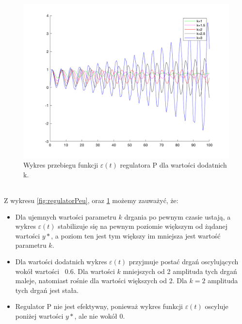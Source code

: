 \documentclass[a4paper,10pt]{article}
\begin{document}
\begin{figure}[!h]
    \centering
	\includegraphics[width=130mm]{P-kd.png}
	\caption{Wykres przebiegu funkcji $\varepsilon(t)$ regulatora P dla wartości dodatnich k.}
    \label{fig:regulatorPed}
\end{figure}
\\ Z wykresu \ref{fig:regulatorPeu}, oraz \ref{fig:regulatorPed} możemy zauważyć, że:
\begin{itemize}
	\item Dla ujemnych wartości parametru $k$ drgania po pewnym czasie ustają, a wykres $\varepsilon(t)$ stabilizuje się na pewnym poziomie większym od żądanej wartości $y*$, a poziom ten jest tym większy im mniejsza jest wartość parametru $k$.
	\item Dla wartości dodatnich wykres $\varepsilon(t)$ przyjmuje postać drgań oscylujących wokół wartości ~0.6. Dla wartości $k$ mniejszych od 2 amplituda tych drgań maleje, natomiast rośnie dla wartości większych od 2. Dla $k=2$ amplituda tych drgań jest stała.
	\item Regulator P nie jest efektywny, ponieważ wykres funkcji $\varepsilon(t)$ oscyluje poniżej wartości $y*$, ale nie wokół 0.
\end{itemize}
\end{document}
